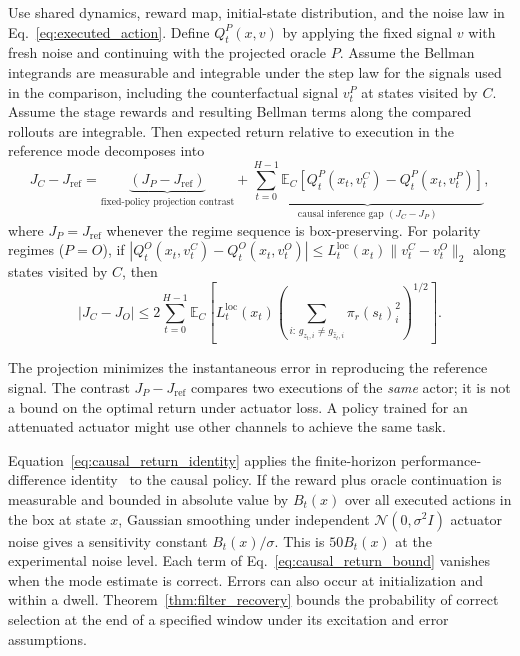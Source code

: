 \documentclass[twoside,11pt]{article}
\begin{document}
\begin{theorem}
\label{thm:return_gap}
Use shared dynamics, reward map, initial-state distribution, and the noise law in Eq.~\eqref{eq:executed_action}. Define $Q_t^P(x,v)$ by applying the fixed signal $v$ with fresh noise and continuing with the projected oracle $P$. Assume the Bellman integrands are measurable and integrable under the step law for the signals used in the comparison, including the counterfactual signal $v_t^P$ at states visited by $C$. Assume the stage rewards and resulting Bellman terms along the compared rollouts are integrable. Then expected return relative to execution in the reference mode decomposes into
\begin{equation}
 J_C - J_{\mathrm{ref}}
 = \underbrace{\left(J_P - J_{\mathrm{ref}}\right)}_{\text{fixed-policy projection contrast}}
 + \underbrace{\sum_{t=0}^{H-1}\mathbb{E}_C\!\left[
   Q_t^P(x_t,v_t^C)-Q_t^P(x_t,v_t^P)\right]}_{\text{causal inference gap } (J_C - J_P)},
 \label{eq:causal_return_identity}
\end{equation}
where $J_P=J_{\mathrm{ref}}$ whenever the regime sequence is box-preserving. For polarity regimes ($P=O$), if
$|Q_t^O(x_t,v_t^C)-Q_t^O(x_t,v_t^O)|\leq L_t^{\mathrm{loc}}(x_t)\|v_t^C-v_t^O\|_2$
along states visited by $C$, then
\begin{equation}
 |J_C-J_O|\leq 2\sum_{t=0}^{H-1}\mathbb{E}_C\!\left[
 L_t^{\mathrm{loc}}(x_t)\left(\sum_{i:\,g_{z_t,i}\ne g_{\hat z_t,i}}
 \pi_r(s_t)_i^2\right)^{1/2}\right].
 \label{eq:causal_return_bound}
\end{equation}
\end{theorem}

The projection minimizes the instantaneous error in reproducing the reference signal. The contrast $J_P-J_{\mathrm{ref}}$ compares two executions of the \emph{same} actor; it is not a bound on the optimal return under actuator loss. A policy trained for an attenuated actuator might use other channels to achieve the same task.

Equation~\eqref{eq:causal_return_identity} applies the finite-horizon performance-difference identity~\citep{Kakade2002PDL} to the causal policy. If the reward plus oracle continuation is measurable and bounded in absolute value by $B_t(x)$ over all executed actions in the box at state $x$, Gaussian smoothing under independent $\mathcal{N}(0,\sigma^2 I)$ actuator noise gives a sensitivity constant $B_t(x)/\sigma$. This is $50 B_t(x)$ at the experimental noise level. Each term of Eq.~\eqref{eq:causal_return_bound} vanishes when the mode estimate is correct. Errors can also occur at initialization and within a dwell. Theorem~\ref{thm:filter_recovery} bounds the probability of correct selection at the end of a specified window under its excitation and error assumptions.
\end{document}
